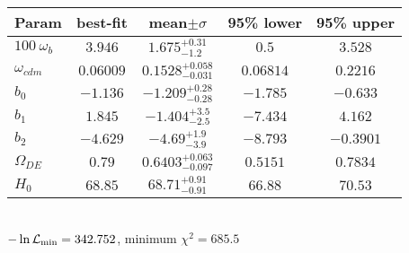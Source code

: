 \begin{tabular}{|l|c|c|c|c|} 
 \hline 
Param & best-fit & mean$\pm\sigma$ & 95\% lower & 95\% upper \\ \hline 
$100~\omega_{b }$ &$3.946$ & $1.675_{-1.2}^{+0.31}$ & $0.5$ & $3.528$ \\ 
$\omega_{cdm }$ &$0.06009$ & $0.1528_{-0.031}^{+0.058}$ & $0.06814$ & $0.2216$ \\ 
$b_{0 }$ &$-1.136$ & $-1.209_{-0.28}^{+0.28}$ & $-1.785$ & $-0.633$ \\ 
$b_{1 }$ &$1.845$ & $-1.404_{-2.5}^{+3.5}$ & $-7.434$ & $4.162$ \\ 
$b_{2 }$ &$-4.629$ & $-4.69_{-3.9}^{+1.9}$ & $-8.793$ & $-0.3901$ \\ 
$\Omega_{DE}$ &$0.79$ & $0.6403_{-0.097}^{+0.063}$ & $0.5151$ & $0.7834$ \\ 
$H_{0 }$ &$68.85$ & $68.71_{-0.91}^{+0.91}$ & $66.88$ & $70.53$ \\ 
\hline 
 \end{tabular} \\ 
$-\ln{\cal L}_\mathrm{min} =342.752$, minimum $\chi^2=685.5$ \\ 
